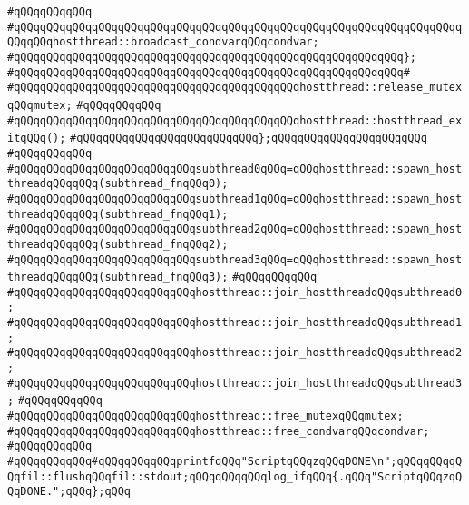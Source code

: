 \verb|#qQQqqQQqqQQq|\newline
\verb|#qQQqqQQqqQQqqQQqqQQqqQQqqQQqqQQqqQQqqQQqqQQqqQQqqQQqqQQqqQQqqQQqqQQqqQQqqQQqhostthread::broadcast_condvarqQQqcondvar;|\newline
\verb|#qQQqqQQqqQQqqQQqqQQqqQQqqQQqqQQqqQQqqQQqqQQqqQQqqQQqqQQqqQQq};|\newline
\verb|#qQQqqQQqqQQqqQQqqQQqqQQqqQQqqQQqqQQqqQQqqQQqqQQqqQQqqQQqqQQq#|\newline
\verb|#qQQqqQQqqQQqqQQqqQQqqQQqqQQqqQQqqQQqqQQqqQQqhostthread::release_mutexqQQqmutex;|\newline
\verb|#qQQqqQQqqQQq|\newline
\verb|#qQQqqQQqqQQqqQQqqQQqqQQqqQQqqQQqqQQqqQQqqQQqhostthread::hostthread_exitqQQq();|\newline
\verb|#qQQqqQQqqQQqqQQqqQQqqQQqqQQq};qQQqqQQqqQQqqQQqqQQqqQQq|\newline
\verb|#qQQqqQQqqQQq|\newline
\verb|#qQQqqQQqqQQqqQQqqQQqqQQqqQQqsubthread0qQQq=qQQqhostthread::spawn_hostthreadqQQqqQQq(subthread_fnqQQq0);|\newline
\verb|#qQQqqQQqqQQqqQQqqQQqqQQqqQQqsubthread1qQQq=qQQqhostthread::spawn_hostthreadqQQqqQQq(subthread_fnqQQq1);|\newline
\verb|#qQQqqQQqqQQqqQQqqQQqqQQqqQQqsubthread2qQQq=qQQqhostthread::spawn_hostthreadqQQqqQQq(subthread_fnqQQq2);|\newline
\verb|#qQQqqQQqqQQqqQQqqQQqqQQqqQQqsubthread3qQQq=qQQqhostthread::spawn_hostthreadqQQqqQQq(subthread_fnqQQq3);|\newline
\verb|#qQQqqQQqqQQq|\newline
\verb|#qQQqqQQqqQQqqQQqqQQqqQQqqQQqhostthread::join_hostthreadqQQqsubthread0;|\newline
\verb|#qQQqqQQqqQQqqQQqqQQqqQQqqQQqhostthread::join_hostthreadqQQqsubthread1;|\newline
\verb|#qQQqqQQqqQQqqQQqqQQqqQQqqQQqhostthread::join_hostthreadqQQqsubthread2;|\newline
\verb|#qQQqqQQqqQQqqQQqqQQqqQQqqQQqhostthread::join_hostthreadqQQqsubthread3;|\newline
\verb|#qQQqqQQqqQQq|\newline
\verb|#qQQqqQQqqQQqqQQqqQQqqQQqqQQqhostthread::free_mutexqQQqmutex;|\newline
\verb|#qQQqqQQqqQQqqQQqqQQqqQQqqQQqhostthread::free_condvarqQQqcondvar;|\newline
\verb|#qQQqqQQqqQQq|\newline
\verb|#qQQqqQQqqQQq#qQQqqQQqqQQqprintfqQQq"ScriptqQQqzqQQqDONE\n";qQQqqQQqqQQqfil::flushqQQqfil::stdout;qQQqqQQqqQQqlog_ifqQQq{.qQQq"ScriptqQQqzqQQqDONE.";qQQq};qQQq|\newline
